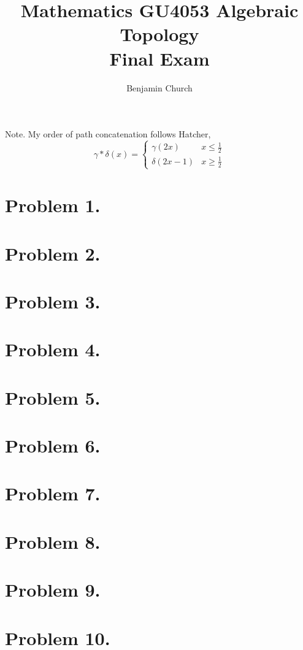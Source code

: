 \documentclass[12pt]{extarticle}
\begin{document}
{\title{%
	\large \textbf{Mathematics GU4053 Algebraic Topology
	\\ Final Exam} \vspace{-2ex}}
\author{Benjamin Church }
\maketitle}

Note. My order of path concatenation follows Hatcher,
\[\gamma * \delta(x) = \begin{cases}
\gamma(2x) & x \le \tfrac{1}{2} \\
\delta(2x - 1) & x \ge \tfrac{1}{2}
\end{cases}\]
 
\section*{Problem 1.}

\section*{Problem 2.}

\section*{Problem 3.}

\section*{Problem 4.}

\section*{Problem 5.}

\section*{Problem 6.}

\section*{Problem 7.}

\section*{Problem 8.}

\section*{Problem 9.}

\section*{Problem 10.}
\end{document}
